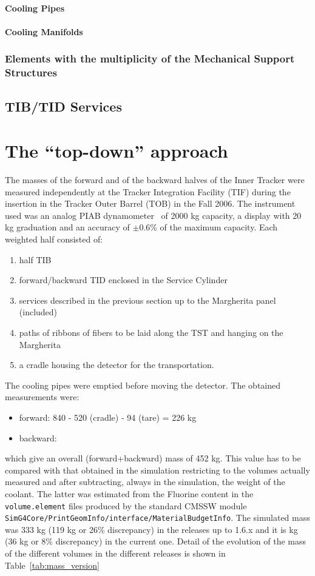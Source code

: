 \documentclass{cmspaper}
\begin{document}
\paragraph{Cooling Pipes}
\paragraph{Cooling Manifolds}
\subsubsection{Elements with the multiplicity of the Mechanical Support Structures}

\subsection{TIB/TID Services}

\pagebreak
\section{The ``top-down'' approach}
The masses of the forward and of the backward halves of the Inner
Tracker were measured independently at the Tracker Integration
Facility (TIF) during the insertion in the Tracker Outer Barrel (TOB)
in the Fall 2006. 
The instrument used was an analog PIAB dynamometer~\cite{piab}  of
2000 kg capacity, a display with 20 kg graduation and an accuracy of
$\pm$0.6\% of the maximum capacity. 
Each weighted half consisted of: 
\begin{enumerate}
\item half TIB  
\item forward/backward TID enclosed in the Service Cylinder
\item services described in the previous section up to the Margherita
  panel (included)
\item paths of ribbons of fibers to be laid along the TST and hanging on the
Margherita 
\item a cradle housing the detector for the transportation. 
\end{enumerate}
The cooling pipes were emptied before moving the detector.
The obtained measurements were:
\begin{itemize}
\item forward: 840 - 520 (cradle) - 94 (tare) = 226 kg 
\item backward:
\end{itemize}
which give an overall (forward+backward) mass of 452 kg.
This value has to be compared with that obtained in the simulation
restricting to the volumes actually measured and after subtracting,
always in the simulation, the weight of the coolant. 
The latter was estimated from the Fluorine content  in the
{\tt volume.element} files produced by the standard CMSSW module {\tt
  SimG4Core/PrintGeomInfo/interface/MaterialBudgetInfo}.
The simulated mass was 333 kg (119 kg or 26\% discrepancy) in the
releases up to 1.6.x and it is   kg (36 kg or 8\%
discrepancy) in the current one.
Detail of the evolution of the mass of the different volumes in the
different releases is shown in Table~\ref{tab:mass_version}
\end{document}
